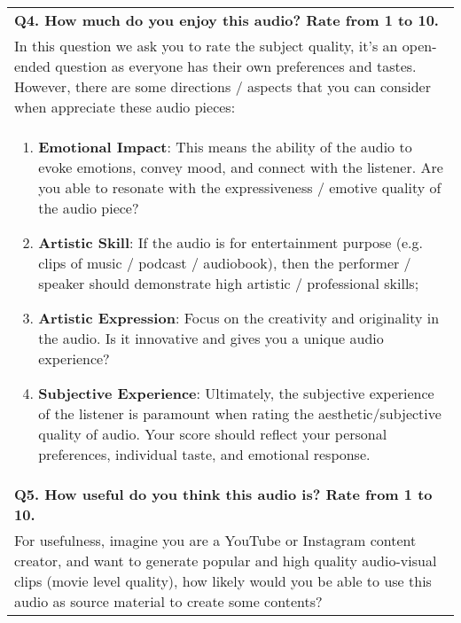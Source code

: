 \begin{table*}[ht]
\begin{tabular}{p{15cm}}
\textbf{Q4. How much do you enjoy this audio? Rate from 1 to 10.} \\
In this question we ask you to rate the subject quality, it’s an open-ended question as everyone has their own preferences and tastes. However, there are some directions / aspects that you can consider when appreciate these audio pieces: \\
\begin{enumerate}[leftmargin=.75cm]
    \item \textbf{Emotional Impact}: This means the ability of the audio to evoke emotions, convey mood, and connect with the listener. Are you able to resonate with the expressiveness / emotive quality of the audio piece?
    \item \textbf{Artistic Skill}: If the audio is for entertainment purpose (e.g. clips of music / podcast / audiobook), then the performer / speaker should demonstrate high artistic / professional skills;
    \item \textbf{Artistic Expression}: Focus on the creativity and originality in the audio. Is it innovative and gives you a unique audio experience?
    \item \textbf{Subjective Experience}: Ultimately, the subjective experience of the listener is paramount when rating the aesthetic/subjective quality of audio. Your score should reflect your personal preferences, individual taste, and emotional response.
\end{enumerate}
\\
\textbf{Q5. How useful do you think this audio is? Rate from 1 to 10.} \\
For usefulness, imagine you are a YouTube or Instagram content creator, and want to generate popular and high quality audio-visual clips (movie level quality), how likely would you be able to use this audio as source material to create some contents?\\
\bottomrule\bottomrule
\end{tabular}
\end{table*}